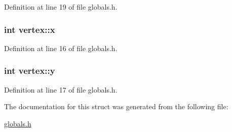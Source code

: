 Definition at line 19 of file globals.\+h.

\subsubsection[{\texorpdfstring{x}{x}}]{\setlength{\rightskip}{0pt plus 5cm}int vertex\+::x}\hypertarget{structvertex_a170e80128423a8b3307dd7908fc7564c}{}\label{structvertex_a170e80128423a8b3307dd7908fc7564c}


Definition at line 16 of file globals.\+h.

\subsubsection[{\texorpdfstring{y}{y}}]{\setlength{\rightskip}{0pt plus 5cm}int vertex\+::y}\hypertarget{structvertex_adc996af0584614ec01cdf8f23bdafc7b}{}\label{structvertex_adc996af0584614ec01cdf8f23bdafc7b}


Definition at line 17 of file globals.\+h.



The documentation for this struct was generated from the following file\+:\begin{DoxyCompactItemize}
\item 
\hyperlink{globals_8h}{globals.\+h}\end{DoxyCompactItemize}
